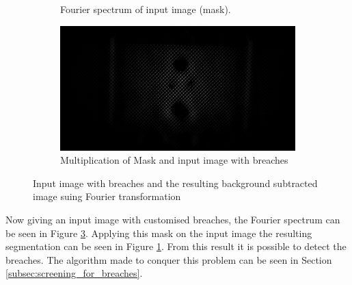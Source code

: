 \documentclass[../Head/Main.tex]{subfiles}
\begin{document}
\begin{figure}[H]
\begin{subfigure}{.48\textwidth}
        \caption{Fourier spectrum of input image (mask).}
        \label{fig:fouier_detected_with_breaches}
    \end{subfigure}
    \hfill
    \begin{subfigure}{.48\textwidth}
        \centering
        \includegraphics[width=\textwidth]{../Figures/fourier_transformation/fence_breach_20_low_pass_filtered.png}
        \caption{Multiplication of Mask and input image with breaches}
        \label{fig:fourier_mask_with_breach}
    \end{subfigure}    
    \caption{Input image with breaches and the resulting background subtracted image suing Fourier transformation}
\end{figure}

Now giving an input image with customised breaches, the Fourier spectrum can be seen in Figure \ref{fig:fourier_mask_with_breach}. Applying this mask on the input image the resulting segmentation can be seen in Figure \ref{fig:fouier_detected_with_breaches}. From this result it is possible to detect the breaches. The algorithm made to conquer this problem can be seen in Section \ref{subsec:screening_for_breaches}.   
\end{document}
